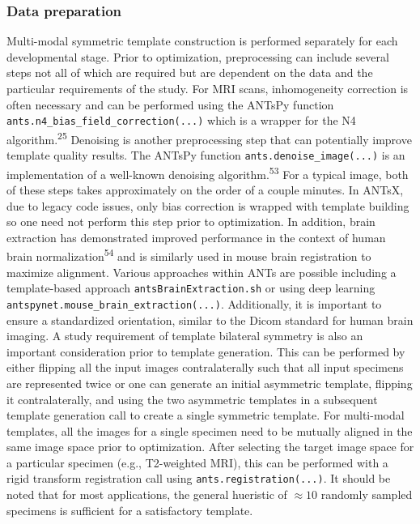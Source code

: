 \documentclass[
  12pt,
]{article}
\begin{document}
\hypertarget{data-preparation}{%
\subsubsection*{Data preparation}\label{data-preparation}}

Multi-modal symmetric template construction is performed separately for
each developmental stage. Prior to optimization, preprocessing can
include several steps not all of which are required but are dependent on
the data and the particular requirements of the study. For MRI scans,
inhomogeneity correction is often necessary and can be performed using
the ANTsPy function \texttt{ants.n4\_bias\_field\_correction(...)} which
is a wrapper for the N4 algorithm.\textsuperscript{25} Denoising is
another preprocessing step that can potentially improve template quality
results. The ANTsPy function \texttt{ants.denoise\_image(...)} is an
implementation of a well-known denoising algorithm.\textsuperscript{53}
For a typical image, both of these steps takes approximately on the
order of a couple minutes. In ANTsX, due to legacy code issues, only
bias correction is wrapped with template building so one need not
perform this step prior to optimization. In addition, brain extraction
has demonstrated improved performance in the context of human brain
normalization\textsuperscript{54} and is similarly used in mouse brain
registration to maximize alignment. Various approaches within ANTs are
possible including a template-based approach
\texttt{antsBrainExtraction.sh} or using deep learning
\texttt{antspynet.mouse\_brain\_extraction(...)}. Additionally, it is
important to ensure a standardized orientation, similar to the Dicom
standard for human brain imaging. A study requirement of template
bilateral symmetry is also an important consideration prior to template
generation. This can be performed by either flipping all the input
images contralaterally such that all input specimens are represented
twice or one can generate an initial asymmetric template, flipping it
contralaterally, and using the two asymmetric templates in a subsequent
template generation call to create a single symmetric template. For
multi-modal templates, all the images for a single specimen need to be
mutually aligned in the same image space prior to optimization. After
selecting the target image space for a particular specimen (e.g.,
T2-weighted MRI), this can be performed with a rigid transform
registration call using \texttt{ants.registration(...)}. It should be
noted that for most applications, the general hueristic of
\(\approx 10\) randomly sampled specimens is sufficient for a
satisfactory template.
\end{document}
